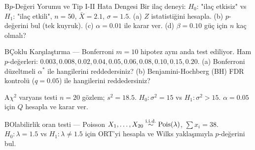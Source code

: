 \begin{alistirma}[Al.14.2b]{B}{$p$-Değeri Yorumu ve Tip I-II Hata Dengesi}
Bir ilaç deneyi: $H_0$: "ilaç etkisiz" vs $H_1$: "ilaç etkili", $n=50$, $\bar X=2.1$, $\sigma=1.5$. (a) $Z$ istatistiğini hesapla. (b) $p$-değerini bul (tek kuyruk). (c) $\alpha=0.01$ ile karar ver. (d) $\beta=0.10$ güç için $n$ kaç olmalı?
\end{alistirma}

\begin{alistirma}[Al.14.2c]{B}{Çoklu Karşılaştırma --- Bonferroni}
$m=10$ hipotez aynı anda test ediliyor. Ham $p$-değerleri: $0.003, 0.008, 0.02, 0.04, 0.05, 0.06, 0.08, 0.10, 0.15, 0.20$. (a) Bonferroni düzeltmeli $\alpha^*$ ile hangilerini reddedersiniz? (b) Benjamini-Hochberg (BH) FDR kontrolü ($q=0.05$) ile hangilerini reddedersiniz?
\end{alistirma}

\alistirmalar

\begin{alistirma}[Al.14.3]{A}{$\chi^2$ varyans testi}
$n=20$ gözlem; $s^2=18.5$. $H_0:\sigma^2=15$ vs $H_1:\sigma^2>15$. $\alpha=0.05$ için $Q$ hesapla ve karar ver.
\end{alistirma}

\begin{alistirma}[Al.14.4]{B}{Olabilirlik oran testi --- Poisson}
$X_1,\ldots,X_{20}\overset{\text{i.i.d.}}{\sim}\operatorname{Pois}(\lambda)$, $\sum x_i=38$. $H_0:\lambda=1.5$ vs $H_1:\lambda\neq1.5$ için ORT'yi hesapla ve Wilks yaklaşımıyla $p$-değerini bul.
\end{alistirma}

